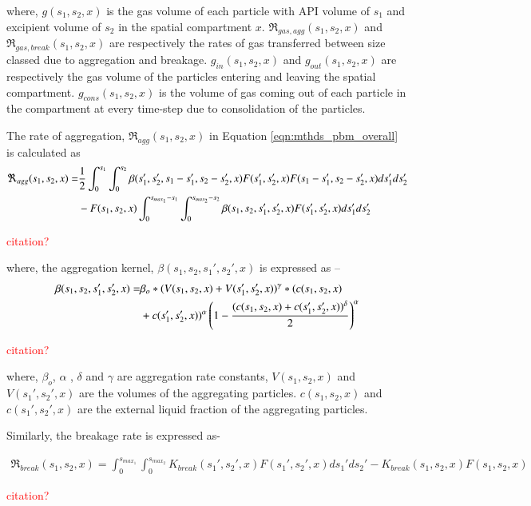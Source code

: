 \documentclass[preprint,11pt,authoryear]{elsarticle}
\begin{document}
	    \par where, $g(s_1,s_2,x)$ is the gas volume of each particle with API volume of $s_1$ and excipient volume of $s_2$ in the spatial compartment $x$. $\Re_{gas,agg}(s_1,s_2,x)$ and $\Re_{gas,break}(s_1,s_2,x)$ are respectively the rates of gas transferred between size classed due to aggregation and breakage. $g_{in}(s_1,s_2,x)$ and $g_{out}(s_1,s_2,x)$ are respectively the gas volume of the particles entering and leaving the spatial compartment. $g_{cons}(s_1,s_2,x)$ is the volume of gas coming out of each particle in the compartment at every time-step due to consolidation of the particles. 
	    \par The rate of aggregation, $\Re_{agg}(s_1,s_2,x)$ in Equation \ref{eqn:mthds_pbm_overall} is calculated as  
	     \begin{align}
	     \Re_{agg}(s_1,s_2,x)=& \frac{1}{2}\int _0^{s_1} \int_0^{s_2} \beta(s_1',s_2',s_1-s_1',s_2-s_2',x)F(s_1',s_2',x)F(s_1-s_1',s_2-s_2',x)ds_1'ds_2'\notag\\ 
	     &- F(s_1,s_2,x)\int _0^{s_{max_1}-s_1} \int_0^{s_{max_2}-s_2} \beta(s_1,s_2,s_1',s_2',x)F(s_1',s_2',x)ds_1'ds_2'
	     \end{align}
	     \par \textcolor{red}{citation?}
	     
	    \par where, the aggregation kernel, $\beta(s_1,s_2, s_1',s_2',x)$ is expressed as –
	    \begin{align}
	    \beta(s_1,s_2,s_1',s_2',x) = & \beta_o*(V(s_1,s_2,x)+V(s_1',s_2',x))^{\gamma}*(c(s_1,s_2,x)\notag\\
	    &+c(s_1',s_2',x))^{\alpha}\left(1-\frac{(c(s_1,s_2,x)+c(s_1',s_2',x))^{\delta}}{2}\right)^{\alpha}
	    \label{eqn:mthds_pbm_beta_kernal}
	    \end{align}
	    \par \textcolor{red}{citation?}
	    
	    \par where, $\beta_o$,  $\alpha$ , $\delta$ and $\gamma$ are aggregation rate constants, $V(s_1,s_2, x)$ and $V(s_1',s_2',x)$ are the volumes of the aggregating particles. $c(s_1,s_2, x)$ and $c(s_1',s_2',x)$ are the external liquid fraction of the aggregating particles. 
	    \par Similarly, the breakage rate is expressed as-
	
	    \begin{align}
	    \Re_{break}(s_1,s_2,x) = \int_0^{s_{max_1}} \int_0^{s_{max_2}} K_{break}(s_1',s_2',x)F(s_1',s_2',x)ds_1'ds_2' - K_{break}(s_1,s_2,x)F(s_1,s_2,x)
	    \end{align}
	    \par \textcolor{red}{citation?}
	    
\end{document}
